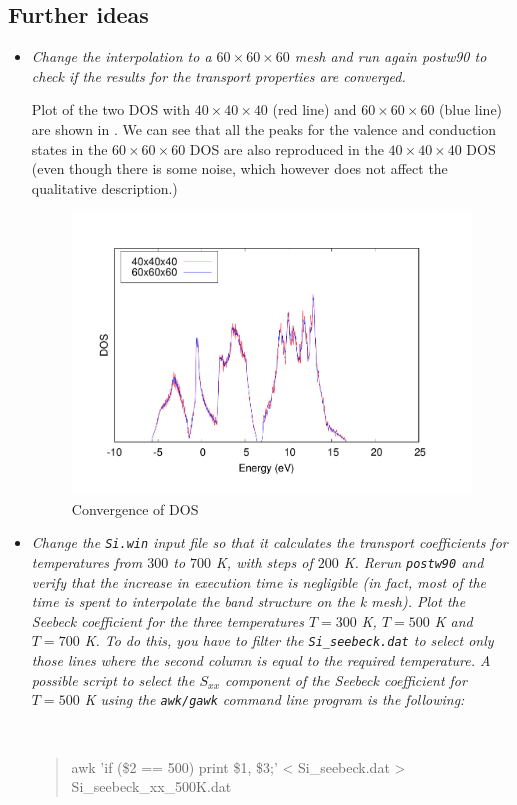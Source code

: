 \subsection*{Further ideas}
\begin{itemize}
  \item {\it Change the interpolation to a $60\times60\times60$ mesh and run again postw90 to check if the results
for the transport properties are converged.}

Plot of the two DOS with $40\times40\times40$ (red line) and $60\times60\times60$ (blue line) are shown in . We can see that all the peaks for the valence and conduction states in the $60\times60\times60$ DOS are also reproduced in the $40\times40\times40$ DOS (even though there is some noise, which however does not affect the qualitative description.)

\begin{figure}[h!]
\centering
\includegraphics[width=0.7\columnwidth]{figure/example16/Si_boltzdos_convergence.pdf}
\caption{Convergence of DOS}\label{fig16.3}
\end{figure}

  \item {\it Change the {\tt Si.win} input file so that it calculates the transport coefficients for temperatures from
$300$ to $700$ K, with steps of $200$ K. Rerun {\tt postw90} and verify that the increase in execution time
is negligible (in fact, most of the time is spent to interpolate the band structure on the k mesh).
Plot the Seebeck coefficient for the three temperatures $T = 300$ K, $T = 500$ K and $T = 700$ K.
To do this, you have to filter the {\tt Si\_seebeck.dat} to select only those lines where the second
column is equal to the required temperature. A possible script to select the $S_{xx}$ component of the
Seebeck coefficient for $T = 500$ K using the {\tt awk/gawk} command line program is the following:
{\tt 
\begin{quote}
awk '{if (\$2 == 500) {print \$1, \$3;}}' < Si\_seebeck.dat > Si\_seebeck\_xx\_500K.dat
\end{quote}}
}


\end{itemize}

